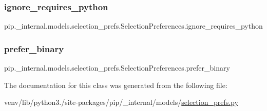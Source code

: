 \subsubsection{\texorpdfstring{ignore\+\_\+requires\+\_\+python}{ignore\_requires\_python}}
{\footnotesize\ttfamily pip.\+\_\+internal.\+models.\+selection\+\_\+prefs.\+Selection\+Preferences.\+ignore\+\_\+requires\+\_\+python\hspace{0.3cm}{\ttfamily [static]}}

\mbox{\label{classpip_1_1__internal_1_1models_1_1selection__prefs_1_1SelectionPreferences_a44d406c39de271606a18f520f881cbb5}} 
\subsubsection{\texorpdfstring{prefer\+\_\+binary}{prefer\_binary}}
{\footnotesize\ttfamily pip.\+\_\+internal.\+models.\+selection\+\_\+prefs.\+Selection\+Preferences.\+prefer\+\_\+binary\hspace{0.3cm}{\ttfamily [static]}}



The documentation for this class was generated from the following file\+:\begin{DoxyCompactItemize}
\item 
venv/lib/python3./site-\/packages/pip/\+\_\+internal/models/\hyperlink{selection__prefs_8py}{selection\+\_\+prefs.\+py}\end{DoxyCompactItemize}
